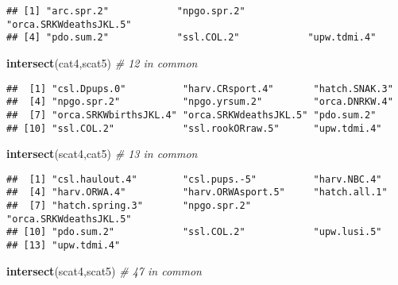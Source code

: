 \documentclass[]{article}
\newenvironment{Shaded}{\begin{snugshade}}{\end{snugshade}}
\newcommand{\KeywordTok}[1]{\textcolor[rgb]{0.13,0.29,0.53}{\textbf{{#1}}}}
\newcommand{\CommentTok}[1]{\textcolor[rgb]{0.56,0.35,0.01}{\textit{{#1}}}}
\newcommand{\NormalTok}[1]{{#1}}
\begin{document}
\begin{verbatim}
## [1] "arc.spr.2"            "npgo.spr.2"           "orca.SRKWdeathsJKL.5"
## [4] "pdo.sum.2"            "ssl.COL.2"            "upw.tdmi.4"
\end{verbatim}

\begin{Shaded}
\begin{Highlighting}[]
\KeywordTok{intersect}\NormalTok{(cat4,scat5) }\CommentTok{# 12 in common}
\end{Highlighting}
\end{Shaded}

\begin{verbatim}
##  [1] "csl.Dpups.0"          "harv.CRsport.4"       "hatch.SNAK.3"        
##  [4] "npgo.spr.2"           "npgo.yrsum.2"         "orca.DNRKW.4"        
##  [7] "orca.SRKWbirthsJKL.4" "orca.SRKWdeathsJKL.5" "pdo.sum.2"           
## [10] "ssl.COL.2"            "ssl.rookORraw.5"      "upw.tdmi.4"
\end{verbatim}

\begin{Shaded}
\begin{Highlighting}[]
\KeywordTok{intersect}\NormalTok{(scat4,cat5) }\CommentTok{# 13 in common}
\end{Highlighting}
\end{Shaded}

\begin{verbatim}
##  [1] "csl.haulout.4"        "csl.pups.-5"          "harv.NBC.4"          
##  [4] "harv.ORWA.4"          "harv.ORWAsport.5"     "hatch.all.1"         
##  [7] "hatch.spring.3"       "npgo.spr.2"           "orca.SRKWdeathsJKL.5"
## [10] "pdo.sum.2"            "ssl.COL.2"            "upw.lusi.5"          
## [13] "upw.tdmi.4"
\end{verbatim}

\begin{Shaded}
\begin{Highlighting}[]
\KeywordTok{intersect}\NormalTok{(scat4,scat5) }\CommentTok{# 47 in common}
\end{Highlighting}
\end{Shaded}
\end{document}
